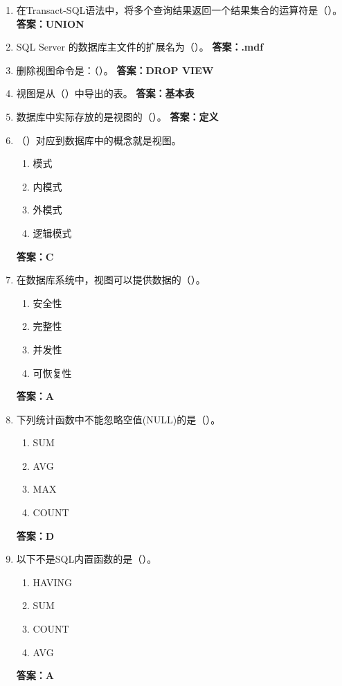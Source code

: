 \documentclass[12pt, a4paper]{article}
\begin{document}
\begin{enumerate}[label=\arabic*.]
	\item 在Transact-SQL语法中，将多个查询结果返回一个结果集合的运算符是（\quad）。
	      \textbf{答案：UNION}

	\item SQL Server 的数据库主文件的扩展名为（\quad）。
	      \textbf{答案：.mdf}

	\item 删除视图命令是：（\quad）。
	      \textbf{答案：DROP VIEW}

	\item 视图是从（\quad）中导出的表。
	      \textbf{答案：基本表}

	\item 数据库中实际存放的是视图的（\quad）。
	      \textbf{答案：定义}

	\item （\quad）对应到数据库中的概念就是视图。
	      \begin{enumerate}
		      \item 模式
		      \item 内模式
		      \item 外模式
		      \item 逻辑模式
	      \end{enumerate}
	      \textbf{答案：C}

	\item 在数据库系统中，视图可以提供数据的（\quad）。
	      \begin{enumerate}
		      \item 安全性
		      \item 完整性
		      \item 并发性
		      \item 可恢复性
	      \end{enumerate}
	      \textbf{答案：A}

	\item 下列统计函数中不能忽略空值(NULL)的是（\quad）。
	      \begin{enumerate}
		      \item SUM
		      \item AVG
		      \item MAX
		      \item COUNT
	      \end{enumerate}
	      \textbf{答案：D}

	\item 以下不是SQL内置函数的是（\quad）。
	      \begin{enumerate}
		      \item HAVING
		      \item SUM
		      \item COUNT
		      \item AVG
	      \end{enumerate}
	      \textbf{答案：A}


\end{enumerate}
\end{document}
